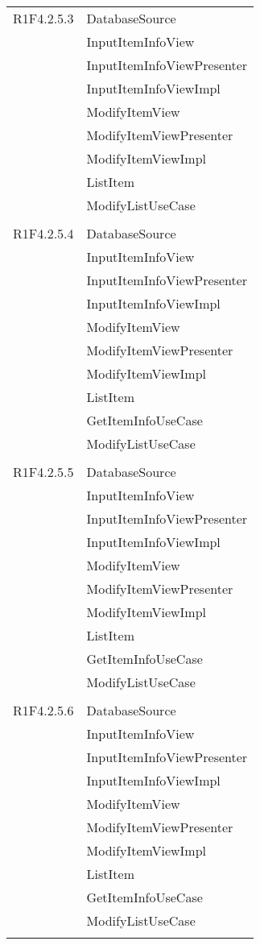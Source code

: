 \begin{center}
\begin{longtable}{|p{7cm}|p{7cm}|}
		R1F4.2.5.3 & DatabaseSource \\ & InputItemInfoView \\ & InputItemInfoViewPresenter \\ & InputItemInfoViewImpl \\ & ModifyItemView \\ & ModifyItemViewPresenter \\ & ModifyItemViewImpl \\ & ListItem \\ & ModifyListUseCase \\ & \\ \hline
		R1F4.2.5.4 & DatabaseSource \\ & InputItemInfoView \\ & InputItemInfoViewPresenter \\ & InputItemInfoViewImpl \\ & ModifyItemView \\ & ModifyItemViewPresenter \\ & ModifyItemViewImpl \\ & ListItem \\ & GetItemInfoUseCase \\ & ModifyListUseCase \\ & \\ \hline
		R1F4.2.5.5 & DatabaseSource \\ & InputItemInfoView \\ & InputItemInfoViewPresenter \\ & InputItemInfoViewImpl \\ & ModifyItemView \\ & ModifyItemViewPresenter \\ & ModifyItemViewImpl \\ & ListItem \\ & GetItemInfoUseCase \\ & ModifyListUseCase \\ & \\ \hline
		R1F4.2.5.6 & DatabaseSource \\ & InputItemInfoView \\ & InputItemInfoViewPresenter \\ & InputItemInfoViewImpl \\ & ModifyItemView \\ & ModifyItemViewPresenter \\ & ModifyItemViewImpl \\ & ListItem \\ & GetItemInfoUseCase \\ & ModifyListUseCase \\ & \\ \hline

\end{longtable}
\end{center}
